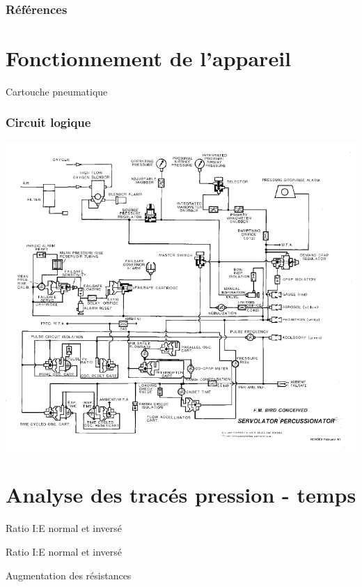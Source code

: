 \appendix

\begin{frame}[allowframebreaks]
\frametitle{Références}
	\nocite{*}
	\printbibliography{}
\end{frame}

\section{Fonctionnement de l'appareil}

\begin{frame}{Cartouche pneumatique}
	
\end{frame}

\begin{frame}[b]
	\frametitle{Circuit logique}
	\centering
	\includegraphics[height=\textheight]{img/circuit-logique.pdf}
\end{frame}

\section{Analyse des tracés pression - temps}

\begin{frame}{Ratio I:E normal et inversé}
	
\end{frame}

\begin{frame}{Ratio I:E normal et inversé}
	
\end{frame}

\begin{frame}{Augmentation des résistances}
	\centering
	
\end{frame}
